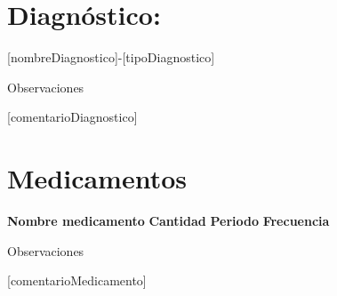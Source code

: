 \documentclass{article}
\begin{document}
\begin{minipage}[c]{0.95\textwidth}
\section*{Diagnóstico:}{[nombreDiagnostico]}-{[tipoDiagnostico]}
\begin{list}{}
\item\Large{Observaciones}
\item\large{[comentarioDiagnostico]}
\end{list}
\end{minipage}
\vspace{6mm}

\begin{minipage}[c]{1\textwidth}
\section*{Medicamentos}
\end{minipage}
\vspace{1mm}
\begin{paracol}{4}\sloppy
    \switchcolumn[0]\noindent
    \textbf{Nombre medicamento}
\switchcolumn[1]\noindent
    \textbf{Cantidad}
\switchcolumn[2]\noindent
    \textbf{Periodo} 
\switchcolumn[3]\noindent
    \textbf{Frecuencia}
\end{paracol}
\vspace{1mm}

\begin{paracol}{4}\sloppy
    \switchcolumn[0]\noindent
    [nombreMedicamento]
\switchcolumn[1]\noindent
    [cantidad]
\switchcolumn[2]\noindent
    [periodo]
\switchcolumn[3]\noindent
    [frecuencia]
\end{paracol}
\begin{list}{}
\item\Large{Observaciones}
\item\large{[comentarioMedicamento]}
\end{list}

\vspace{1mm}
\end{document}
